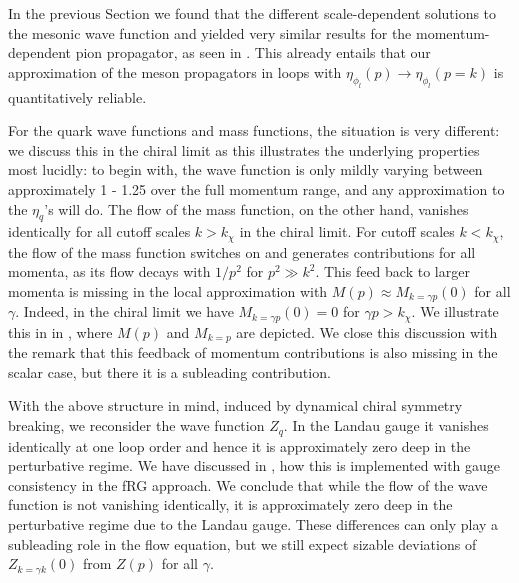 \documentclass[aps,twocolumn,prd,superscriptaddress]{revtex4-2}
\begin{document}
In the previous Section we found that the different scale-dependent solutions to the mesonic wave function  and  yielded very similar results for the momentum-dependent pion propagator, as seen in . This already entails that our approximation of the meson propagators in loops with $\eta_{\phi_l}(p)\to \eta_{\phi_l}(p=k)$ is quantitatively reliable. 

For the quark wave functions and mass functions, the situation is very different: we discuss this in the chiral limit as this illustrates the underlying properties most lucidly: to begin with, the wave function is only mildly varying between approximately 1 - 1.25 over the full momentum range, and any approximation to the $\eta_q$'s will do. The flow of the mass function, on the other hand, vanishes identically for all cutoff scales $k>k_\chi$ in the chiral limit. For cutoff scales $k< k_\chi$, the flow of the mass function switches on and generates contributions for all momenta, as its flow decays with $1/p^2$ for $p^2 \gg k^2$. This feed back to larger momenta is missing in the local approximation with $M(p) \approx M_{k=\gamma p}(0)$ for all $\gamma$. Indeed, in the chiral limit we have $M_{k=\gamma p}(0) =0$ for $\gamma p>k_\chi$. We illustrate this in  in , where $M(p)$ and $M_{k=p}$ are depicted. We close this discussion with the remark that this feedback of momentum contributions is also missing in the scalar case, but there it is a subleading contribution. 

With the above structure in mind, induced by dynamical chiral symmetry breaking, we reconsider the wave function $Z_q$. In the Landau gauge it vanishes identically at one loop order and hence it is approximately zero deep in the perturbative regime. We have discussed in , how this is implemented with gauge consistency in the fRG approach. We conclude that while the flow of the wave function is not vanishing identically, it is approximately zero deep in the perturbative regime due to the Landau gauge. These differences can only play a subleading role in the flow equation, but we still expect sizable deviations of $Z_{k=\gamma k}(0)$ from $Z(p)$ for all $\gamma$.
\end{document}
